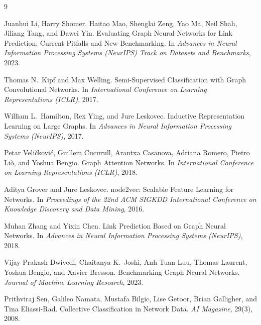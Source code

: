 \documentclass[10pt,a4paper]{article}
\begin{document}

\begin{thebibliography}{9}

Juanhui Li, Harry Shomer, Haitao Mao, Shenglai Zeng, Yao Ma, Neil Shah,
Jiliang Tang, and Dawei Yin.
\newblock Evaluating Graph Neural Networks for Link Prediction:
Current Pitfalls and New Benchmarking.
\newblock In \emph{Advances in Neural Information Processing Systems
(NeurIPS) Track on Datasets and Benchmarks}, 2023.

Thomas N.\ Kipf and Max Welling.
\newblock Semi-Supervised Classification with Graph Convolutional Networks.
\newblock In \emph{International Conference on Learning Representations
(ICLR)}, 2017.

William L.\ Hamilton, Rex Ying, and Jure Leskovec.
\newblock Inductive Representation Learning on Large Graphs.
\newblock In \emph{Advances in Neural Information Processing Systems
(NeurIPS)}, 2017.

Petar Veli\v{c}kovi\'c, Guillem Cucurull, Arantxa Casanova, Adriana
Romero, Pietro Li\`o, and Yoshua Bengio.
\newblock Graph Attention Networks.
\newblock In \emph{International Conference on Learning Representations
(ICLR)}, 2018.

Aditya Grover and Jure Leskovec.
\newblock node2vec: Scalable Feature Learning for Networks.
\newblock In \emph{Proceedings of the 22nd ACM SIGKDD International
Conference on Knowledge Discovery and Data Mining}, 2016.

Muhan Zhang and Yixin Chen.
\newblock Link Prediction Based on Graph Neural Networks.
\newblock In \emph{Advances in Neural Information Processing Systems
(NeurIPS)}, 2018.

Vijay Prakash Dwivedi, Chaitanya K.\ Joshi, Anh Tuan Luu, Thomas Laurent,
Yoshua Bengio, and Xavier Bresson.
\newblock Benchmarking Graph Neural Networks.
\newblock \emph{Journal of Machine Learning Research}, 2023.

Prithviraj Sen, Galileo Namata, Mustafa Bilgic, Lise Getoor, Brian
Galligher, and Tina Eliassi-Rad.
\newblock Collective Classification in Network Data.
\newblock \emph{AI Magazine}, 29(3), 2008.

\end{thebibliography}
\end{document}
